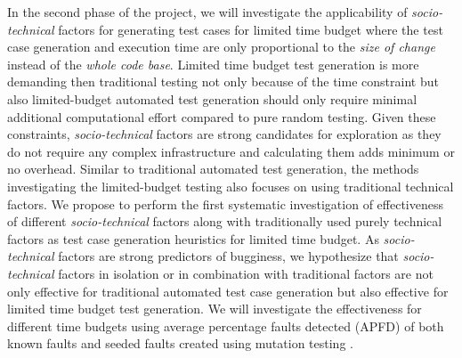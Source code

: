 \documentclass[10pt]{article}
\begin{document}
 In the second phase of the project, we will investigate the applicability of \emph{socio-technical} factors for generating test cases for limited time budget where the test case generation and execution time are only proportional to the \emph{size of change} instead of the \emph{whole code base}. Limited time budget test generation is more demanding then traditional testing not only because of the time constraint but also limited-budget automated test generation should only require minimal additional computational effort compared to pure random testing. Given these constraints, \emph{socio-technical} factors are strong candidates for exploration as they do not require any complex infrastructure and calculating them adds minimum or no overhead. Similar to traditional automated test generation, the methods investigating the limited-budget testing \cite{groce2012lightweight} also focuses on using traditional technical factors. We propose to perform the first systematic investigation of effectiveness of different \emph{socio-technical} factors along with traditionally used purely technical factors as test case generation heuristics for limited time budget. As \emph{socio-technical} factors are strong predictors of bugginess, we hypothesize that \emph{socio-technical} factors in isolation or in combination with traditional factors are not only effective for traditional automated test case generation but also effective for limited time budget test generation. We will investigate the effectiveness for different time budgets using average percentage faults detected (APFD) \cite{elbaum2002test} of both known faults and seeded faults created using mutation testing \cite{ahmed2017applying}.




 

\end{document}
